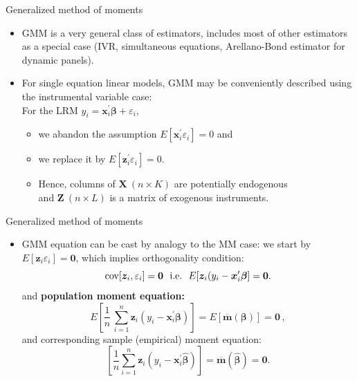 \documentclass{beamer}
\begin{document}
\begin{frame}{Generalized method of moments}
\begin{itemize}
    \item GMM is a very general class of estimators, includes most of other estimators as a special case (IVR, simultaneous equations, Arellano-Bond estimator for dynamic panels). 
    \medskip
    \item For single equation linear models, GMM may be conveniently described using the instrumental variable case:\\ \bigskip For the LRM $y_i = \bm{x}_i^{\prime}\bm{\beta} + \varepsilon_i$, 
    \begin{itemize}
    \medskip
        \item  we abandon the assumption $E[\bm{x}_i^{\prime} \varepsilon_i]=0$ and
        \medskip
        \item we replace it by $E[\bm{z}_i^{\prime} \varepsilon_i]=0$.
        \medskip
        \item Hence, columns of $\bm{X}~(n\!\times\!K)$ are potentially endogenous \\ \medskip and $\bm{Z}~(n\!\times\!L)$ is a matrix of exogenous instruments.
    \end{itemize}
\end{itemize}
\end{frame}
\begin{frame}{Generalized method of moments}

\begin{itemize}
\item GMM equation can be cast by analogy to the MM case: we start by $E[\bm{z}_i \varepsilon_i]=\bm{0}$, which implies orthogonality condition: $$\textnormal{cov}[\bm{z}_i, \varepsilon_i] = \bm{0} \textnormal{~~i.e.~~}E[\bm{z}_i(y_i-\bm{x}_i^{\prime}\bm{\beta}]=\bm{0}.$$ 
and \textbf{population moment equation:}
$$
E \left[ \frac{1}{n} \, \sum_{i=1}^n \bm{z}_i (y_i - \bm{x}_i^{\prime}\bm{\beta}) \right] 
= E \left[ \overline{\mathbf{m}}(\bm{\beta}) \right] = \bm{0}\,,
$$
and corresponding sample (empirical) moment equation:
$$
\left[ \frac{1}{n} \sum_{i=1}^n \bm{z}_i (y_i - \bm{x}_i^{\prime}\hat{\bm{\beta}}) \right]
= \overline{\mathbf{m}}(\hat{\bm{\beta}}) = \bm{0}.
$$
\end{itemize}

\end{frame}
\end{document}
